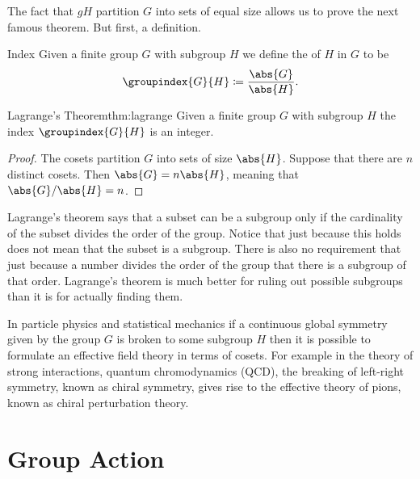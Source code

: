 \documentclass[fleqn]{NotesClass}
\begin{document}
    The fact that \(gH\) partition \(G\) into sets of equal size allows us to prove the next famous theorem.
    But first, a definition.
    
    \begin{dfn}{Index}{}
        Given a finite group \(G\) with subgroup \(H\) we define the  of \(H\) in \(G\) to be
        \begin{equation}
            \groupindex{G}{H} \coloneqq \frac{\abs{G}}{\abs{H}}.
        \end{equation}
    \end{dfn}
    
    \begin{thm}{Lagrange's Theorem}{thm:lagrange}
        Given a finite group \(G\) with subgroup \(H\) the index \(\groupindex{G}{H}\) is an integer.
        
        \begin{proof}
            The cosets partition \(G\) into sets of size \(\abs{H}\).
            Suppose that there are \(n\) distinct cosets.
            Then \(\abs{G} = n\abs{H}\), meaning that \(\abs{G}/\abs{H} = n\).
        \end{proof}
    \end{thm}
    
    Lagrange's theorem says that a subset can be a subgroup only if the cardinality of the subset divides the order of the group.
    Notice that just because this holds does not mean that the subset is a subgroup.
    There is also no requirement that just because a number divides the order of the group that there is a subgroup of that order.
    Lagrange's theorem is much better for ruling out possible subgroups than it is for actually finding them.
    
    \begin{app}{}{}
        In particle physics and statistical mechanics if a continuous global symmetry given by the group \(G\) is broken to some subgroup \(H\) then it is possible to formulate an effective field theory in terms of cosets.
        For example in the theory of strong interactions, quantum chromodynamics (QCD), the breaking of left-right symmetry, known as chiral symmetry, gives rise to the effective theory of pions, known as chiral perturbation theory.
    \end{app}

    \chapter{Group Action}
\end{document}
